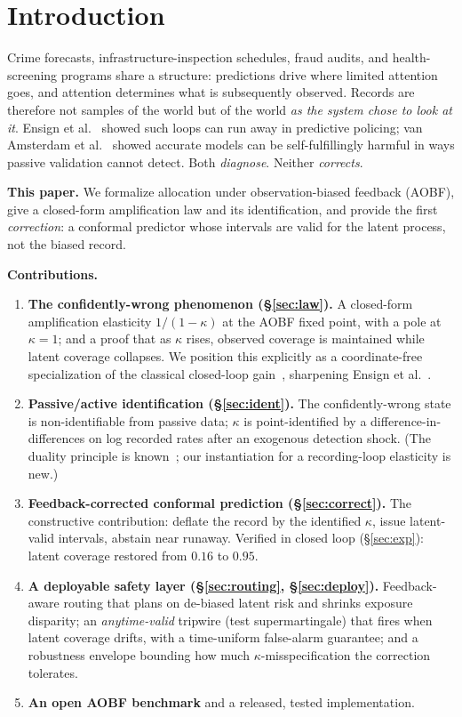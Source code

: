 \documentclass[10pt]{article}
\begin{document}
\section{Introduction}

Crime forecasts, infrastructure-inspection schedules, fraud audits, and
health-screening programs share a structure: predictions drive where limited
attention goes, and attention determines what is subsequently observed. Records
are therefore not samples of the world but of the world \emph{as the system
chose to look at it}. Ensign et al.~\cite{ensign2018} showed such loops can run
away in predictive policing; van Amsterdam et al.~\cite{vanamsterdam2025} showed
accurate models can be self-fulfillingly harmful in ways passive validation
cannot detect. Both \emph{diagnose}. Neither \emph{corrects}.

\textbf{This paper.} We formalize allocation under observation-biased feedback
(AOBF), give a closed-form amplification law and its identification, and provide
the first \emph{correction}: a conformal predictor whose intervals are valid for
the latent process, not the biased record.

\textbf{Contributions.}
\begin{enumerate}
  \item \textbf{The confidently-wrong phenomenon (\S\ref{sec:law}).} A closed-form
        amplification elasticity $1/(1-\kappa)$ at the AOBF fixed point, with a
        pole at $\kappa=1$; and a proof that as $\kappa$ rises, observed coverage
        is maintained while latent coverage collapses. We position this
        explicitly as a coordinate-free specialization of the classical
        closed-loop gain~\cite{glaeser2003}, sharpening Ensign
        et al.~\cite{ensign2018}.
  \item \textbf{Passive/active identification (\S\ref{sec:ident}).} The
        confidently-wrong state is non-identifiable from passive data; $\kappa$
        is point-identified by a difference-in-differences on log recorded rates
        after an exogenous detection shock. (The duality principle is
        known~\cite{mendlerduenner2022}; our instantiation for a recording-loop
        elasticity is new.)
  \item \textbf{Feedback-corrected conformal prediction (\S\ref{sec:correct}).}
        The constructive contribution: deflate the record by the identified
        $\kappa$, issue latent-valid intervals, abstain near runaway. Verified in
        closed loop (\S\ref{sec:exp}): latent coverage restored from $0.16$ to
        $0.95$.
  \item \textbf{A deployable safety layer (\S\ref{sec:routing}, \S\ref{sec:deploy}).}
        Feedback-aware routing that plans on de-biased latent risk and shrinks
        exposure disparity; an \emph{anytime-valid} tripwire (test
        supermartingale) that fires when latent coverage drifts, with a
        time-uniform false-alarm guarantee; and a robustness envelope bounding
        how much $\kappa$-misspecification the correction tolerates.
  \item \textbf{An open AOBF benchmark} and a released, tested implementation.
\end{enumerate}
\end{document}
